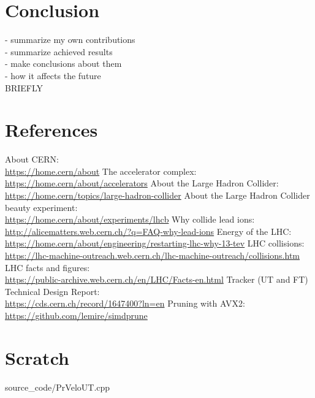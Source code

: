\documentclass[12pt]{article}
\begin{document}
\section{Conclusion}

\color{red}
- summarize my own contributions \\
- summarize achieved results \\
- make conclusions about them \\
- how it affects the future \\
BRIEFLY
\color{black}


\section{References}

\begin{thebibliography}{asd}
	 About CERN: \\
		\url{https://home.cern/about}
	 The accelerator complex: \\
		\url{https://home.cern/about/accelerators}
	 About the Large Hadron Collider: \\
		\url{https://home.cern/topics/large-hadron-collider}
	 About the Large Hadron Collider beauty experiment: \\
		\url{https://home.cern/about/experiments/lhcb}
	 Why collide lead ions: \\
		\url{http://alicematters.web.cern.ch/?q=FAQ-why-lead-ions}
	 Energy of the LHC: \\
		\url{https://home.cern/about/engineering/restarting-lhc-why-13-tev}
	 LHC collisions: \\
		\url{https://lhc-machine-outreach.web.cern.ch/lhc-machine-outreach/collisions.htm}
	 LHC facts and figures: \\
		\url{https://public-archive.web.cern.ch/en/LHC/Facts-en.html}
	 Tracker (UT and FT) Technical Design Report: \\
		\url{https://cds.cern.ch/record/1647400?ln=en}
	 Pruning with AVX2: \\
		\url{https://github.com/lemire/simdprune}
\end{thebibliography}


\newpage
\section{Scratch}


	{source_code/PrVeloUT.cpp}
\end{document}
